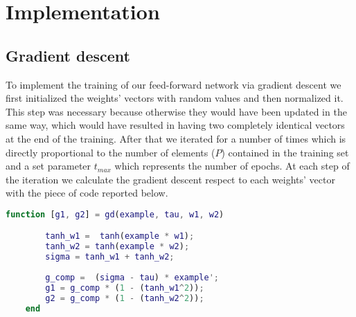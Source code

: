 \section{Implementation}
\label{sec:implementation}

\subsection{Gradient descent}
To implement the training of our feed-forward network via gradient descent we first initialized the weights' vectors with random values and then
normalized it. This step was necessary because otherwise they would have been updated in the same way, which would have resulted
in having two completely identical vectors at the end of the training.
After that we iterated for a number of times which is directly proportional to the number of elements ($P$) contained in the training set and a set parameter
$t_{max}$ which represents the number of epochs. At each step of the iteration we calculate the gradient descent respect to each weights' vector
with the piece of code reported below.

\begin{lstlisting}[language=Matlab] 
    function [g1, g2] = gd(example, tau, w1, w2)

        tanh_w1 =  tanh(example * w1);
        tanh_w2 = tanh(example * w2);
        sigma = tanh_w1 + tanh_w2;
        
        g_comp =  (sigma - tau) * example';
        g1 = g_comp * (1 - (tanh_w1^2));
        g2 = g_comp * (1 - (tanh_w2^2));
    end
\end{lstlisting}

